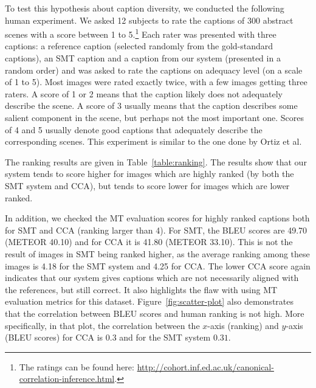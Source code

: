 \documentclass[letterpaper]{article}
\begin{document}
To test this hypothesis about caption diversity, we conducted the following human experiment. We asked 12 subjects to rate the captions of 300 abstract scenes with a score between 1 to
5.\footnote{The ratings can be found here: \url{http://cohort.inf.ed.ac.uk/canonical-correlation-inference.html}.} Each rater was presented with
three captions: a reference caption (selected randomly from the gold-standard captions), an SMT caption and a caption from our system (presented in a random order)
and was asked to rate the captions on adequacy level (on a scale of 1 to 5). Most images
were rated exactly twice, with a few images getting three raters.
A score of 1 or 2 means that the caption likely does not adequately describe the scene. A score of 3 usually means
that the caption describes some salient component in the scene, but perhaps not the most important one. Scores of 4 and 5 usually denote good captions that adequately describe the corresponding scenes.
This experiment is similar to the one done by Ortiz et al.

The ranking results are given in Table~\ref{table:ranking}. The results show that our system tends to score higher for images which are highly ranked (by both the SMT system and CCA),
but tends to score lower for images which are lower ranked.

In addition, we checked the MT evaluation scores for highly ranked captions both for SMT and CCA (ranking larger than 4). For SMT, the BLEU scores are
49.70 (METEOR 40.10) and for CCA it is 41.80 (METEOR 33.10). This is not the result of images in SMT being ranked higher, as the average ranking
among these images is 4.18 for the SMT system and 4.25 for CCA. The lower CCA score again indicates that our system gives captions which are not necessarily aligned
with the references, but still correct. It also highlights the flaw with using MT evaluation metrics for this dataset. Figure~\ref{fig:scatter-plot} also demonstrates
that the correlation between BLEU scores and human ranking is not high. More specifically, in that plot, the correlation between the $x$-axis (ranking) and $y$-axis (BLEU
scores) for CCA is $0.3$ and for the SMT system $0.31$.



\end{document}
